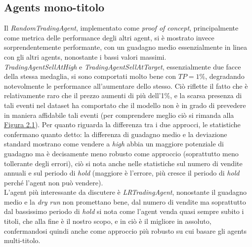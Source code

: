 \documentclass[binding=0.6cm]{sapthesis}
\begin{document}
			\subsection{Agents mono-titolo}
				Il \textit{RandomTradingAgent}, implementato come \textit{proof of concept}, principalmente come metrica delle performance degli altri agent, si è mostrato invece sorprendentemente
				performante, con un guadagno medio essenzialmente in linea con gli altri agents, nonostante i bassi valori massimi. \\
				\textit{TradingAgentSellAtHigh} e \textit{TradingAgentSellAtTarget}, essenzialmente due facce della stessa medaglia, si sono comportati molto bene con $TP = 1\%$, degradando notevolmente
				le performance all'aumentare dello stesso. Ciò riflette il fatto che è relativamente raro che il prezzo aumenti di più dell'1\%, e la scarsa presenza di tali eventi nel dataset ha comportato
				che il modello non è in grado di prevedere in maniera affidabile tali eventi (per comprendere meglio ciò si rimanda alla \underline{\hyperref[fig:nn]{Figura 2.1}}). Per quanto riguarda la
				differenza tra i due approcci, le statistiche confermano quanto detto: la differenza di guadagno medio e la deviazione standard mostrano come vendere a \textit{high} abbia un maggiore potenziale
				di guadagno ma è decisamente meno robusto come approccio (soprattutto meno tollerante degli errori), ciò si nota anche nelle statistiche sul numero di vendite annuali e sul periodo di \textit{hold}
				(maggiore è l'errore, più cresce il periodo di \textit{hold} perché l'agent non può vendere). \\
				L'agent più interessante da discutere è \textit{LRTradingAgent}, nonostante il guadagno medio e la \textit{dry run} non promettano bene, dal numero di vendite ma soprattutto dal bassissimo periodo
				di \textit{hold} si nota come l'agent venda quasi sempre subito i titoli, che alla fine è il nostro scopo, e in ciò è il migliore in assoluto, confermandosi quindi anche come approccio più robusto
				su cui basare gli agents multi-titolo.
\end{document}

